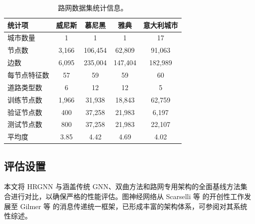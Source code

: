 \begin{table}[H]
\centering
\caption{路网数据集统计信息。}
\label{tab:dataset_stats}
\footnotesize
\begin{tabular}{@{}lcccc@{}}
\toprule
\textbf{统计项} & \textbf{威尼斯} & \textbf{慕尼黑} & \textbf{雅典} & \textbf{意大利城市} \\
\midrule
城市数量 & 1 & 1 & 1 & 17 \\
节点数 & 3,166 & 106,454 & 62,809 & 91,063 \\
边数 & 6,095 & 235,004 & 147,404 & 182,989 \\
每节点特征数 & 57 & 59 & 59 & 60 \\
道路类型数 & 6 & 12 & 12 & 5 \\
训练节点数 & 1,966 & 31,938 & 18,843 & 62,759 \\
验证节点数 & 400 & 37,258 & 21,983 & 6,197 \\
测试节点数 & 800 & 37,258 & 21,983 & 22,107 \\
平均度 & 3.85 & 4.42 & 4.69 & 4.02 \\
\bottomrule
\end{tabular}
\end{table}




\subsection{评估设置}

本文将 HRGNN 与涵盖传统 GNN、双曲方法和路网专用架构的全面基线方法集合进行对比，以确保严格的性能评估。图神经网络从 Scarselli 等\cite{scarselli2009gnn} 的开创性工作发展至 Gilmer 等\cite{gilmer2017mpnn} 的消息传递统一框架，已形成丰富的架构体系，可参阅\cite{ma2022gnn_survey_cn,xu2020gcn_survey_cn}对其系统性综述。

